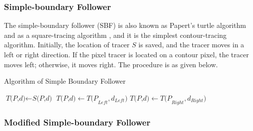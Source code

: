 \subsubsection{Simple-boundary Follower}


The simple-boundary follower (SBF) is also known as Papert's turtle algorithm \cite{Papert1973Uses} and as a square-tracing algorithm \cite{Ghuneim2015Contour}, and it is the simplest contour-tracing algorithm. Initially, the location of tracer $S$ is saved, and the tracer moves in a left or right direction. If the pixel tracer is located on a contour pixel, the tracer moves left; otherwise, it moves right. The procedure is as given below.

\begin{algorithm}
	\caption{Algorithm of Simple Boundary Follower}\label{alg:sbf}
	\begin{algorithmic}[1]
	\State $\textit{T(P,d)} \gets \textit{S(P,d)}$
	\Do
	\State $\textit{T(P,d)} \gets \textit{T(P}_{Left},\textit{d}_{Left} )  $
	\Else
	\State $\textit{T(P,d)} \gets \textit{T(P}_{Right},\textit{d}_{Right})$
	\EndIf
	\EndProcedure
	\end{algorithmic}
\end{algorithm}

\subsubsection{Modified Simple-boundary Follower}



